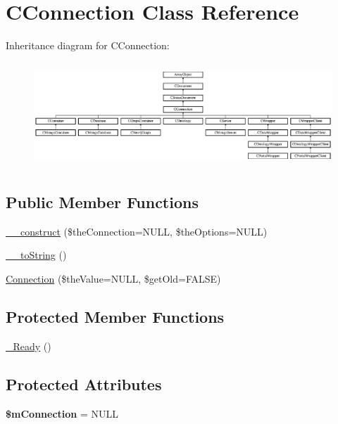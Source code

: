 \hypertarget{class_c_connection}{\section{C\-Connection Class Reference}
\label{class_c_connection}
}
Inheritance diagram for C\-Connection\-:\begin{figure}[H]
\begin{center}
\leavevmode
\includegraphics[height=3.975155cm]{class_c_connection}
\end{center}
\end{figure}
\subsection*{Public Member Functions}
\begin{DoxyCompactItemize}
\item 
\hyperlink{class_c_connection_a5214faf06b04e39885b00e6181991e68}{\-\_\-\-\_\-construct} (\$the\-Connection=N\-U\-L\-L, \$the\-Options=N\-U\-L\-L)
\item 
\hyperlink{class_c_connection_af23aaa67a594e82ff0c43287dc205925}{\-\_\-\-\_\-to\-String} ()
\item 
\hyperlink{class_c_connection_a8ad981138c7b681c875da778ce4e391b}{Connection} (\$the\-Value=N\-U\-L\-L, \$get\-Old=F\-A\-L\-S\-E)
\end{DoxyCompactItemize}
\subsection*{Protected Member Functions}
\begin{DoxyCompactItemize}
\item 
\hyperlink{class_c_connection_a173b6438388d14a21a74c7bbe265958b}{\-\_\-\-Ready} ()
\end{DoxyCompactItemize}
\subsection*{Protected Attributes}
\begin{DoxyCompactItemize}
\item 
\hypertarget{class_c_connection_a97443cb1bba958489af619a23f92b9cd}{{\bfseries \$m\-Connection} = N\-U\-L\-L}\label{class_c_connection_a97443cb1bba958489af619a23f92b9cd}

\end{DoxyCompactItemize}


